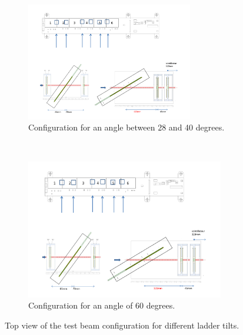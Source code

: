    \begin{figure}[!h]
    \centering
    \begin{subfigure}[t]{0.45\textwidth}
        \includegraphics[width=0.8\textwidth]{Pictures/deformation/tb_cern_11_sketch_tilted.pdf}
        \caption{Configuration for an angle between 28 and 40 degrees.}
        \label{fig:tilt36}
    \end{subfigure}
    ~%
    \begin{subfigure}[t]{0.45\textwidth}
        \includegraphics[width=0.95\textwidth]{Pictures/deformation/tb_cern_11_sketch_tilted120mm.pdf}
        \caption{Configuration for an angle of 60 degrees.}
        \label{fig:tilt60}
    \end{subfigure}
      \caption{Top view of the test beam configuration for different ladder tilts.}
      \label{fig:tilt}
    \end{figure}   

